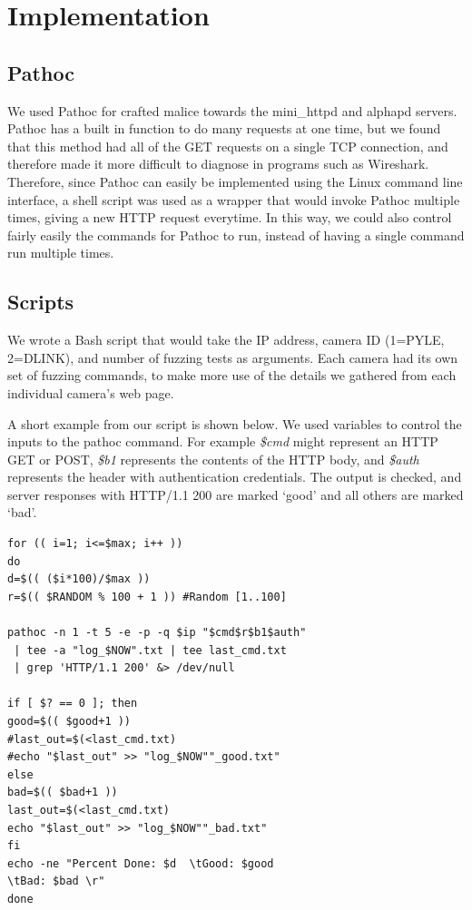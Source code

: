 \documentclass[letterpaper,twocolumn,10pt]{article}
\begin{document}
\section{Implementation}

\subsection{Pathoc}
We used Pathoc for crafted malice towards the mini\_httpd and alphapd servers. Pathoc has a built in function to do many requests at one time, but we found that this method had all of the GET requests on a single TCP connection, and therefore made it more difficult to diagnose in programs such as Wireshark. Therefore, since Pathoc can easily be implemented using the Linux command line interface, a shell script was used as a wrapper that would invoke Pathoc multiple times, giving a new HTTP request everytime. In this way, we could also control fairly easily the commands for Pathoc to run, instead of having a single command run multiple times.



\subsection{Scripts}
We wrote a Bash script that would take the IP address, camera ID (1=PYLE, 2=DLINK), and number of fuzzing tests as arguments. Each camera had its own set of fuzzing commands, to make more use of the details we gathered from each individual camera's web page.

A short example from our script is shown below. We used variables to control the inputs to the pathoc command. For example \textit{\$cmd} might represent an HTTP GET or POST, \textit{\$b1} represents the contents of the HTTP body, and \textit{\$auth} represents the header with authentication credentials. The output is checked, and server responses with HTTP/1.1 200 are marked `good' and all others are marked `bad'. 
\begin{verbatim}
for (( i=1; i<=$max; i++ ))
do	
d=$(( ($i*100)/$max ))
r=$(( $RANDOM % 100 + 1 )) #Random [1..100]

pathoc -n 1 -t 5 -e -p -q $ip "$cmd$r$b1$auth"
 | tee -a "log_$NOW".txt | tee last_cmd.txt
 | grep 'HTTP/1.1 200' &> /dev/null

if [ $? == 0 ]; then
good=$(( $good+1 ))
#last_out=$(<last_cmd.txt)
#echo "$last_out" >> "log_$NOW""_good.txt"
else
bad=$(( $bad+1 ))
last_out=$(<last_cmd.txt)
echo "$last_out" >> "log_$NOW""_bad.txt"
fi		
echo -ne "Percent Done: $d  \tGood: $good   
\tBad: $bad \r"
done
\end{verbatim}
\end{document}
